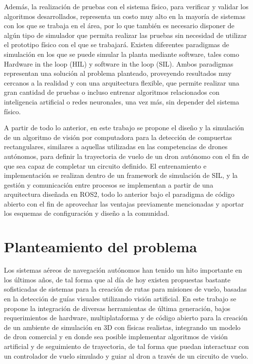 Además, la realización de pruebas con el sistema físico, para verificar y validar los algoritmos desarrollados, representa un costo muy alto en la mayoría de sistemas con los que se trabaja en el área, por lo que también es necesario disponer de algún tipo de simulador que permita realizar las pruebas sin necesidad de utilizar el prototipo físico con el que se trabajará. Existen diferentes paradigmas de simulación en los que se puede simular la planta mediante software, tales como Hardware in the loop (HIL) y software in the loop (SIL). Ambos paradigmas representan una solución al problema planteado, proveyendo resultados muy cercanos a la realidad y con una arquitectura flexible, que permite realizar una gran cantidad de pruebas o incluso entrenar algoritmos relacionados con inteligencia artificial o redes neuronales, una vez más, sin depender del sistema físico. 

A partir de todo lo anterior, en este trabajo se propone el diseño y la simulación de un algoritmo de visión por computadora para la detección de compuertas rectangulares, similares a aquellas utilizadas en las competencias de drones autónomos, para definir la trayectoria de vuelo de un dron autónomo con el fin de que sea capaz de completar un circuito definido.  El entrenamiento e implementación se realizan dentro de un framework de simulación de SIL, y la gestión y comunicación entre procesos se implementan a partir de una arquitectura diseñada en ROS2, todo lo anterior bajo el paradigma de código abierto con el fin de aprovechar las ventajas previamente mencionadas y aportar los esquemas de configuración y diseño a la comunidad.


\section{Planteamiento del problema}
Los sistemas aéreos de navegación autónomos han tenido un hito importante en los últimos años, de tal forma que al día de hoy existen propuestas bastante sofisticadas de sistemas para la creación de rutas para misiones de vuelo, basadas en la detección de guías visuales utilizando visión artificial. En este trabajo se propone la integración de diversas herramientas de última generación, bajos requerimientos de hardware, multiplataforma y de código abierto para la creación de un ambiente de simulación en 3D con físicas realistas, integrando un modelo de dron comercial y en donde sea posible implementar algoritmos de visión artificial y de seguimiento de trayectoria, de tal forma que puedan interactuar con un controlador de vuelo simulado y guiar al dron a través de un circuito de vuelo.    

